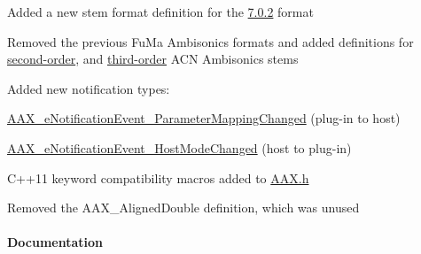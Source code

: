 \begin{DoxyItemize}
\item Added a new stem format definition for the \hyperlink{a00206_ad8af5ef008b2bd478add9a0acb0a1d85ad4d60796473e660c7bc2804cdc93c587}{7.0.2} format  
\item Removed the previous Fu\+Ma Ambisonics formats and added definitions for \hyperlink{a00206_ad8af5ef008b2bd478add9a0acb0a1d85af6461ee858e0f121f7a070142f047dbb}{second-\/order}, and \hyperlink{a00206_ad8af5ef008b2bd478add9a0acb0a1d85a111ef1882171d9eea1b1b436e037fb47}{third-\/order} A\+C\+N Ambisonics stems  
\item Added new notification types\+: 
\begin{DoxyItemize}
\item \hyperlink{a00206_afab5ea2cfd731fc8f163b6caa685406ea92f2ef0cec96b2654789e708d1a1b5e3}{A\+A\+X\+\_\+e\+Notification\+Event\+\_\+\+Parameter\+Mapping\+Changed} (plug-\/in to host) 
\item \hyperlink{a00206_afab5ea2cfd731fc8f163b6caa685406ea59ab8642f090b5ae21385982a1ffaa7b}{A\+A\+X\+\_\+e\+Notification\+Event\+\_\+\+Host\+Mode\+Changed} (host to plug-\/in) 
\end{DoxyItemize}
\item C++11 keyword compatibility macros added to \hyperlink{a00149}{A\+A\+X.\+h}  
\item Removed the {\ttfamily A\+A\+X\+\_\+\+Aligned\+Double} definition, which was unused  
\end{DoxyItemize}\hypertarget{a00375_aax_sdk_2p3p0_Documentation}{}\paragraph{Documentation}\label{a00375_aax_sdk_2p3p0_Documentation}

